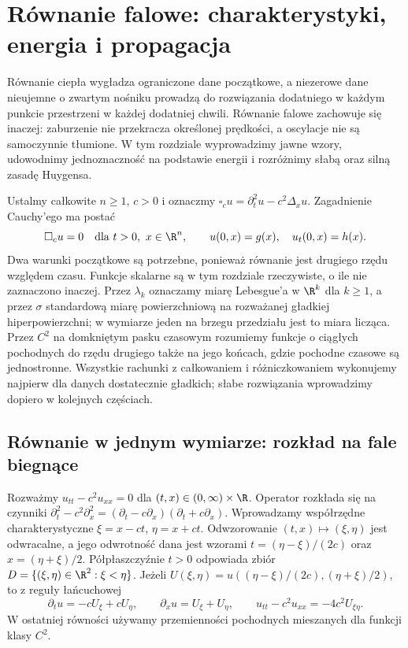 \chapter[Równanie falowe]{Równanie falowe: charakterystyki, energia i propagacja}
\label{chap:pde-wave}

Równanie ciepła wygładza ograniczone dane początkowe,
a niezerowe dane nieujemne o zwartym nośniku prowadzą
do rozwiązania dodatniego w każdym punkcie przestrzeni
w każdej dodatniej chwili. Równanie falowe
zachowuje się inaczej: zaburzenie nie przekracza określonej
prędkości, a oscylacje nie są samoczynnie tłumione. W tym
rozdziale wyprowadzimy jawne wzory, udowodnimy jednoznaczność
na podstawie energii i rozróżnimy słabą oraz silną zasadę
Huygensa.

Ustalmy całkowite $n\geq1$, $c>0$ i oznaczmy
$\square_c u=\partial_t^2u-c^2\Delta_xu$. Zagadnienie
Cauchy'ego ma postać
\begin{equation}\label{eq:pde5-wave}
 \square_cu=0\quad\text{dla }t>0,\ x\in\R^n,\qquad
 u(0,x)=g(x),\quad u_t(0,x)=h(x).
\end{equation}
Dwa warunki początkowe są potrzebne, ponieważ równanie
jest drugiego rzędu względem czasu. Funkcje skalarne
są w tym rozdziale rzeczywiste, o ile nie zaznaczono
inaczej. Przez $\lambda_k$ oznaczamy miarę Lebesgue'a
w $\R^k$ dla $k\geq1$, a przez $\sigma$ standardową
miarę powierzchniową na rozważanej gładkiej
hiperpowierzchni; w wymiarze jeden na brzegu
przedziału jest to miara licząca.
Przez $C^2$ na domkniętym pasku czasowym rozumiemy
funkcje o ciągłych pochodnych do rzędu drugiego
także na jego końcach, gdzie pochodne czasowe
są jednostronne. Wszystkie
rachunki z całkowaniem i różniczkowaniem wykonujemy
najpierw dla danych dostatecznie gładkich; słabe
rozwiązania wprowadzimy dopiero w kolejnych częściach.

\section{Równanie w jednym wymiarze: rozkład na fale biegnące}
\label{sec:pde5-dalembert}

Rozważmy $u_{tt}-c^2u_{xx}=0$ dla $(t,x)\in(0,\infty)\times\R$.
Operator rozkłada się na czynniki
$\partial_t^2-c^2\partial_x^2
=(\partial_t-c\partial_x)(\partial_t+c\partial_x)$.
Wprowadzamy współrzędne charakterystyczne
$\xi=x-ct$, $\eta=x+ct$. Odwzorowanie
$(t,x)\mapsto(\xi,\eta)$ jest odwracalne, a jego
odwrotność dana jest wzorami
$t=(\eta-\xi)/(2c)$ oraz $x=(\eta+\xi)/2$.
Półpłaszczyźnie $t>0$ odpowiada zbiór
$D=\{(\xi,\eta)\in\R^2:\xi<\eta\}$.
Jeżeli $U(\xi,\eta)=u((\eta-\xi)/(2c),(\eta+\xi)/2)$,
to z reguły łańcuchowej
\[
 \partial_tu=-cU_\xi+cU_\eta,\qquad
 \partial_xu=U_\xi+U_\eta,\qquad
 u_{tt}-c^2u_{xx}=-4c^2U_{\xi\eta}.
\]
W ostatniej równości używamy przemienności
pochodnych mieszanych dla funkcji klasy $C^2$.

